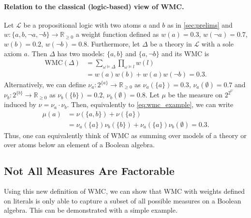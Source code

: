 \documentclass{article}
\begin{document}
\paragraph{Relation to the classical (logic-based) view of WMC.} Let
$\mathcal{L}$ be a propositional logic with two atoms $a$ and $b$ as in
\cref{sec:prelims} and $w\colon \{ a, b, \neg a, \neg b \} \to \mathbb{R}_{\ge
  0}$ a weight function defined as $w(a) = 0.3$, $w(\neg a) = 0.7$, $w(b)
= 0.2$, $w(\neg b) = 0.8$. Furthermore, let $\Delta$ be a theory in
$\mathcal{L}$ with a sole axiom $a$. Then $\Delta$ has two models: $\{ a, b \}$
and $\{ a, \neg b \}$ and its WMC \cite{DBLP:journals/ai/ChaviraD08} is
\begin{equation} \label{eq:wmc_example}
  \begin{split}
    \mathrm{WMC}(\Delta) &= \sum_{\omega \models \Delta} \prod_{\omega \models l} w(l) \\
    &= w(a)w(b) + w(a)w(\neg b) = 0.3.
  \end{split}
\end{equation}
Alternatively, we can define $\nu_a\colon 2^{\{a\}} \to \mathbb{R}_{\ge 0}$ as
$\nu_a(\{ a \}) = 0.3$, $\nu_a(\emptyset) = 0.7$ and $\nu_b\colon 2^{\{b\}} \to
\mathbb{R}_{\ge 0}$ as $\nu_b(\{ b \}) = 0.2$, $\nu_b(\emptyset) = 0.8$. Let
$\mu$ be the measure on $2^{2^U}$ induced by $\nu = \nu_a \cdot \nu_b$. Then,
equivalently to \cref{eq:wmc_example}, we can write
\begin{align*}
  \mu(a) &= \nu(\{ a, b \}) + \nu(\{ a \}) \\
         &= \nu_a(\{a\})\nu_b(\{b\}) + \nu_a(\{a\})\nu_b(\emptyset) = 0.3.
\end{align*}
Thus, one can equivalently think of WMC as summing over models of a theory or
over atoms below an element of a Boolean algebra.

\subsection{Not All Measures Are Factorable}

Using this new definition of WMC, we can show that WMC with weights defined on
literals is only able to capture a subset of all possible measures on a
Boolean algebra. This can be demonstrated with a simple example.
\end{document}
